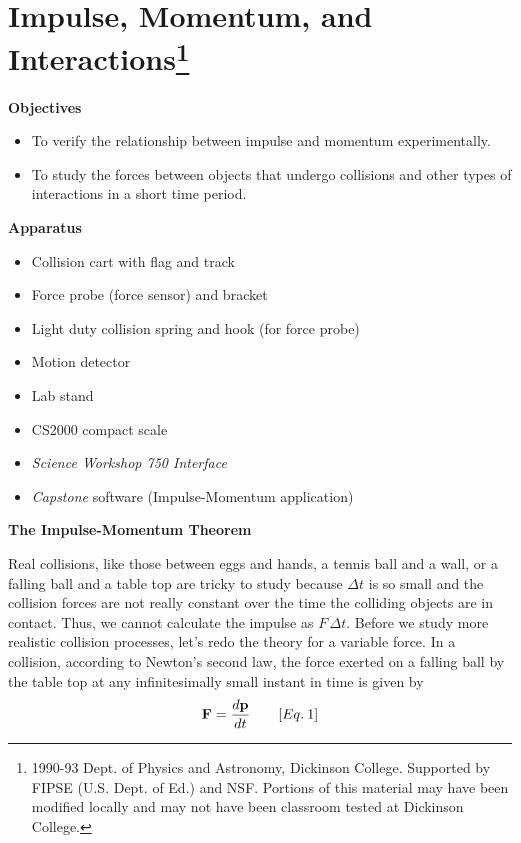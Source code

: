 
\section{Impulse, Momentum, and Interactions\footnote{
1990-93 Dept. of Physics and Astronomy, Dickinson College. Supported by FIPSE
(U.S. Dept. of Ed.) and NSF. Portions of this material may have been modified
locally and may not have been classroom tested at Dickinson College.
}}

\makelabheader %

\textbf{Objectives }

\begin{itemize}
\item To verify the relationship between impulse and momentum experimentally. 
\item To study the forces between objects that undergo collisions and other types of interactions in a short time period.
\end{itemize}
\textbf{Apparatus} 

\begin{itemize}
\item Collision cart with flag and track 
\item Force probe (force sensor) and bracket
\item Light duty collision spring and hook (for force probe)
\item Motion detector
\item Lab stand
\item CS2000 compact scale
\item \textit{Science Workshop 750 Interface}
\item \textit{Capstone} software (Impulse-Momentum application)
\end{itemize}
\textbf{The Impulse-Momentum Theorem }

Real collisions, like those between eggs and hands, a tennis ball and a wall, or
a falling ball and a table top are tricky to study because $\Delta t$ 
is so small and
the collision forces are not really constant over the time the colliding objects
are in contact. Thus, we cannot calculate the impulse as $F \,\Delta t$. 
Before we study
more realistic collision processes, let's redo the theory for a variable force.
In a collision, according to Newton's second law, the force exerted on a falling
ball by the table top at any infinitesimally small instant in time is given
by
\[
{\bf F}=\frac{d{\bf p}}{dt}\qquad [Eq.\: 1]\]


